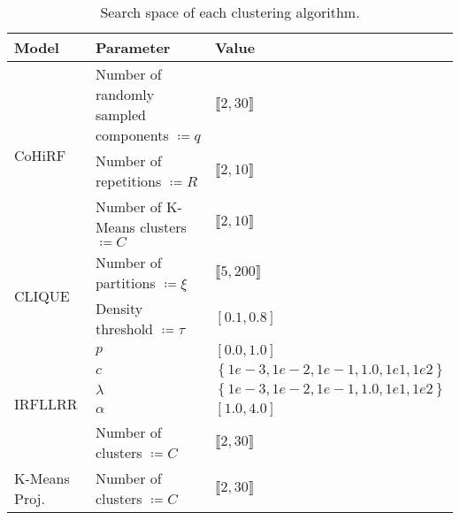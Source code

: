 \begin{table}[h]
    \caption{Search space of each clustering algorithm.}
    \label{tab:search-space}
    \vskip 0.15in
    \begin{center}
    \begin{small}
    \begin{sc}
\begin{tabular}{@{}lll@{}}
\toprule
Model                           & Parameter                                              & Value                                          \\ \midrule
\multirow{3}{*}{CoHiRF}         & Number of randomly sampled components $\coloneqq q$    & $\llbracket2,30\rrbracket$                     \\
                                & Number of repetitions $\coloneqq R$                    & $\llbracket2,10\rrbracket$                     \\
                                & Number of K-Means clusters $\coloneqq C$               & $\llbracket2,10\rrbracket$                     \\ \midrule
\multirow{2}{*}{CLIQUE}         & Number of partitions $\coloneqq \xi$                   & $\llbracket5,200\rrbracket$                    \\
                                & Density threshold $\coloneqq \tau$                     & $\left[0.1,0.8\right]$                         \\ \midrule
\multirow{5}{*}{IRFLLRR}        & $p$                                                    & $\left[0.0,1.0\right]$                         \\
                                & $c$                                                    & $\left\{ 1e-3,1e-2,1e-1,1.0,1e1,1e2\right\}$   \\
                                & $\lambda$                                              & $\left\{ 1e-3,1e-2,1e-1,1.0,1e1,1e2\right\}$   \\
                                & $\alpha$                                               & $\left[1.0,4.0\right]$                         \\
                                & Number of clusters $\coloneqq C$                       & $\llbracket2,30\rrbracket$                     \\ \midrule
K-Means Proj.                   & Number of clusters $\coloneqq C$                       & $\llbracket2,30\rrbracket$                     \\ \midrule

\end{tabular}
\end{sc}
\end{small}
\end{center}
\end{table}
